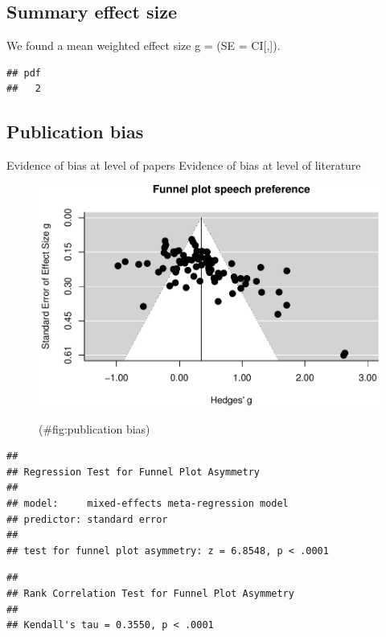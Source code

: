 \documentclass[]{apa6}
\begin{document}
\subsection{Summary effect size}\label{summary-effect-size}

We found a mean weighted effect size g = (SE = CI{[},{]}).

\begin{verbatim}
## pdf 
##   2
\end{verbatim}

\subsection{Publication bias}\label{publication-bias}

Evidence of bias at level of papers Evidence of bias at level of
literature

\begin{figure}

{\centering \includegraphics{MA_speech_pref_files/figure-latex/publication bias-1} 

}

\caption{ }(\#fig:publication bias)
\end{figure}

\begin{verbatim}
## 
## Regression Test for Funnel Plot Asymmetry
## 
## model:     mixed-effects meta-regression model
## predictor: standard error
## 
## test for funnel plot asymmetry: z = 6.8548, p < .0001
\end{verbatim}

\begin{verbatim}
## 
## Rank Correlation Test for Funnel Plot Asymmetry
## 
## Kendall's tau = 0.3550, p < .0001
\end{verbatim}
\end{document}
